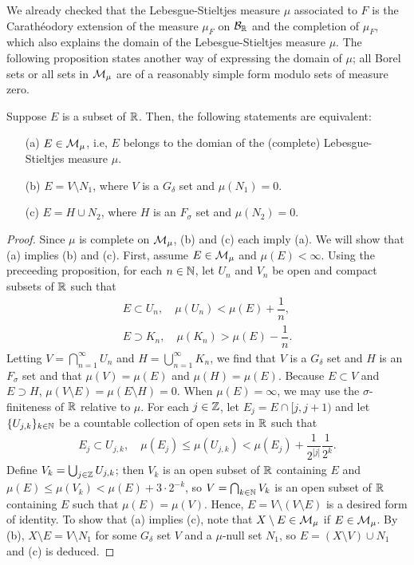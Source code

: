 We already checked that the Lebesgue-Stieltjes measure $\mu$ associated to $F$ is the Carath\'{e}odory extension of the measure $\mu_F$ on ${\mathcal{B}}_{\mathbb{R}}$ and the completion of $\mu_F$, which also explains the domain of the Lebesgue-Stieltjes measure $\mu$.
The following proposition states another way of expressing the domain of $\mu$; all Borel sets or all sets in ${\mathcal{M}}_\mu$ are of a reasonably simple form modulo sets of measure zero.
\begin{prop}
    Suppose $E$ is a subset of ${\mathbb{R}}$.
    Then, the following statements are equivalent:
    \begin{enumerate}
        \item[(a)]
        {
            $E\in{\mathcal{M}}_\mu$, i.e, $E$ belongs to the domian of the (complete) Lebesgue-Stieltjes measure $\mu$.
        }
        \item[(b)]
        {
            $E=V\setminus N_1$, where $V$ is a $G_\delta$ set and $\mu(N_1)=0$.
        }
        \item[(c)]
        {
            $E=H\cup N_2$, where $H$ is an $F_\sigma$ set and $\mu(N_2)=0$.
        }
    \end{enumerate}
\end{prop}
\begin{proof}
    Since $\mu$ is complete on ${\mathcal{M}}_\mu$, (b) and (c) each imply (a).
    We will show that (a) implies (b) and (c).
    First, assume $E\in{\mathcal{M}}_\mu$ and $\mu(E)<\infty$.
    Using the preceeding proposition, for each $n\in{\mathbb{N}}$, let $U_n$ and $V_n$ be open and compact subsets of ${\mathbb{R}}$ such that
    \begin{align*}
        E\subset U_n,\quad \mu(U_n)<\mu(E)+\dfrac{1}{n},\\
        E\supset K_n,\quad \mu(K_n)>\mu(E)-\dfrac{1}{n}.
    \end{align*}
    Letting $V=\bigcap_{n=1}^\infty U_n$ and $H=\bigcup_{n=1}^\infty K_n$, we find that $V$ is a $G_\delta$ set and $H$ is an $F_\sigma$ set and that $\mu(V)=\mu(E)$ and $\mu(H)=\mu(E)$.
    Because $E\subset V$ and $E\supset H$, $\mu(V\setminus E)=\mu(E\setminus H)=0$.
    When $\mu(E)=\infty$, we may use the $\sigma$-finiteness of ${\mathbb{R}}$ relative to $\mu$.
    For each $j\in{\mathbb{Z}}$, let $E_j=E\cap[j, j+1)$ and let $\{U_{j, k}\}_{k\in{\mathbb{N}}}$ be a countable collection of open sets in ${\mathbb{R}}$ such that
    \begin{align*}
        E_j\subset U_{j, k},\quad \mu(E_j)\leq\mu(U_{j, k})<\mu(E_j)+\dfrac{1}{2^{|j|}}\dfrac{1}{2^k}.
    \end{align*}
    Define $V_k=\bigcup_{j\in{\mathbb{Z}}} U_{j, k}$; then $V_k$ is an open subset of ${\mathbb{R}}$ containing $E$ and $\mu(E)\leq\mu(V_k)<\mu(E)+3\cdot 2^{-k}$, so $V=\bigcap_{k\in{\mathbb{N}}} V_k$ is an open subset of ${\mathbb{R}}$ containing $E$ such that $\mu(E)=\mu(V)$.
    Hence, $E=V\setminus(V\setminus E)$ is a desired form of identity.
    To show that (a) implies (c), note that $X\setminus E\in{\mathcal{M}}_\mu$ if $E\in{\mathcal{M}}_\mu$.
    By (b), $X\setminus E=V\setminus N_1$ for some $G_\delta$ set $V$ and a $\mu$-null set $N_1$, so $E=(X\setminus V)\cup N_1$ and (c) is deduced.
\end{proof}

